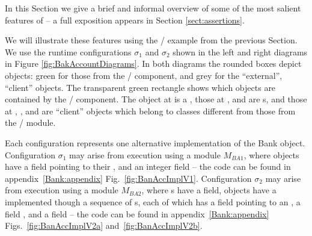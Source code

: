 %
In this Section we  give a brief and informal  overview of some of the most salient features of  
\Chainmail -- a full exposition appears in Section \ref{sect:assertions}.



 We  will illustrate these features using the  / example from the previous Section.
We   use the runtime configurations $\sigma_1$ and $\sigma_2$ 
shown in the left and right diagrams in Figure \ref{fig:BakAccountDiagrams}.
In both diagrams the rounded boxes depict objects:  green for those from the 
/ component, and grey for the ``external'',  ``client'' objects.
The transparent green rectangle  shows which objects are contained by the / component.
The object at  is a , those at ,  and  are 
s, and those at , ,  and  are 
``client'' objects which belong to classes different from those from the /  module.

Each configuration represents one alternative implementation of the Bank object.
Configuration  $\sigma_1$ may arise from execution using a module $M_{BA1}$, where   objects
  have a field  pointing to their , and an integer field  
-- the code can be found in appendix~\ref{Bank:appendix} Fig.~\ref{fig:BanAccImplV1}.
Configuration  $\sigma_2$ may arise from execution using a module $M_{BA2}$,  where s have a 
field,   objects  have a  implemented though a sequence of s, each of which has a
 field pointing to an , a field , and a
 field  -- the code can be found in appendix~\ref{Bank:appendix}
Figs.~\ref{fig:BanAccImplV2a} and~\ref{fig:BanAccImplV2b}.

